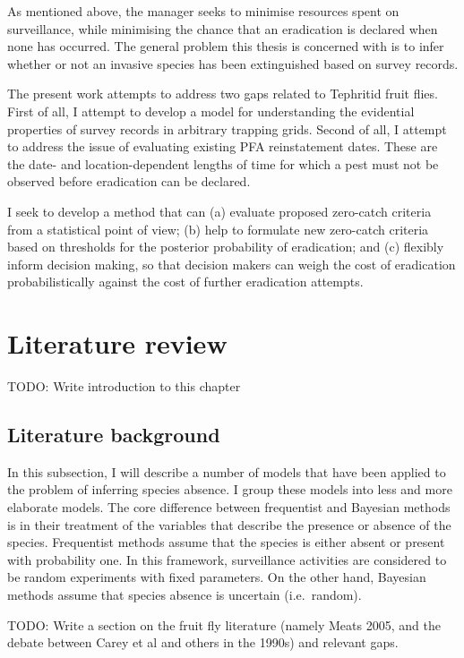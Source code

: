 \documentclass[
]{book}
\begin{document}
As mentioned above, the manager seeks to minimise resources spent on surveillance, while minimising the chance that an eradication is declared when none has occurred. The general problem this thesis is concerned with is to infer whether or not an invasive species has been extinguished based on survey records.

The present work attempts to address two gaps related to Tephritid fruit flies. First of all, I attempt to develop a model for understanding the evidential properties of survey records in arbitrary trapping grids. Second of all, I attempt to address the issue of evaluating existing PFA reinstatement dates. These are the date- and location-dependent lengths of time for which a pest must not be observed before eradication can be declared.

I seek to develop a method that can (a) evaluate proposed zero-catch criteria from a statistical point of view; (b) help to formulate new zero-catch criteria based on thresholds for the posterior probability of eradication; and (c) flexibly inform decision making, so that decision makers can weigh the cost of eradication probabilistically against the cost of further eradication attempts.

\hypertarget{lit-review}{%
\chapter{Literature review}\label{lit-review}}

TODO: Write introduction to this chapter

\hypertarget{literature-background}{%
\section{Literature background}\label{literature-background}}

In this subsection, I will describe a number of models that have been applied to the problem of inferring species absence. I group these models into less and more elaborate models. The core difference between frequentist and Bayesian methods is in their treatment of the variables that describe the presence or absence of the species. Frequentist methods assume that the species is either absent or present with probability one. In this framework, surveillance activities are considered to be random experiments with fixed parameters. On the other hand, Bayesian methods assume that species absence is uncertain (i.e.~random).

TODO: Write a section on the fruit fly literature (namely Meats 2005, and the debate between Carey et al and others in the 1990s) and relevant gaps.
\end{document}
